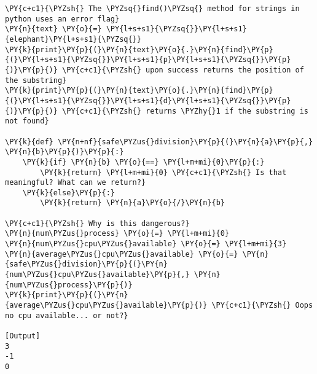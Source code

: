 \begin{Verbatim}[label=\makebox{\url{https://github.com/lucabaldini/cmepda/tree/master/slides/latex/snippets/error\_flags.py}},commandchars=\\\{\}]
\PY{c+c1}{\PYZsh{} The \PYZsq{}find()\PYZsq{} method for strings in python uses an error flag}
\PY{n}{text} \PY{o}{=} \PY{l+s+s1}{\PYZsq{}}\PY{l+s+s1}{elephant}\PY{l+s+s1}{\PYZsq{}}
\PY{k}{print}\PY{p}{(}\PY{n}{text}\PY{o}{.}\PY{n}{find}\PY{p}{(}\PY{l+s+s1}{\PYZsq{}}\PY{l+s+s1}{p}\PY{l+s+s1}{\PYZsq{}}\PY{p}{)}\PY{p}{)} \PY{c+c1}{\PYZsh{} upon success returns the position of the substring}
\PY{k}{print}\PY{p}{(}\PY{n}{text}\PY{o}{.}\PY{n}{find}\PY{p}{(}\PY{l+s+s1}{\PYZsq{}}\PY{l+s+s1}{d}\PY{l+s+s1}{\PYZsq{}}\PY{p}{)}\PY{p}{)} \PY{c+c1}{\PYZsh{} returns \PYZhy{}1 if the substring is not found}

\PY{k}{def} \PY{n+nf}{safe\PYZus{}division}\PY{p}{(}\PY{n}{a}\PY{p}{,} \PY{n}{b}\PY{p}{)}\PY{p}{:}
    \PY{k}{if} \PY{n}{b} \PY{o}{==} \PY{l+m+mi}{0}\PY{p}{:}
        \PY{k}{return} \PY{l+m+mi}{0} \PY{c+c1}{\PYZsh{} Is that meaningful? What can we return?}
    \PY{k}{else}\PY{p}{:}
        \PY{k}{return} \PY{n}{a}\PY{o}{/}\PY{n}{b}

\PY{c+c1}{\PYZsh{} Why is this dangerous?}
\PY{n}{num\PYZus{}process} \PY{o}{=} \PY{l+m+mi}{0}
\PY{n}{num\PYZus{}cpu\PYZus{}available} \PY{o}{=} \PY{l+m+mi}{3}
\PY{n}{average\PYZus{}cpu\PYZus{}available} \PY{o}{=} \PY{n}{safe\PYZus{}division}\PY{p}{(}\PY{n}{num\PYZus{}cpu\PYZus{}available}\PY{p}{,} \PY{n}{num\PYZus{}process}\PY{p}{)}
\PY{k}{print}\PY{p}{(}\PY{n}{average\PYZus{}cpu\PYZus{}available}\PY{p}{)} \PY{c+c1}{\PYZsh{} Oops no cpu available... or not?}

[Output]
3
-1
0
\end{Verbatim}